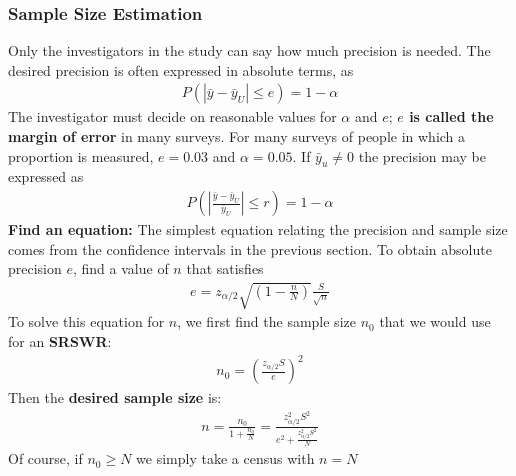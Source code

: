 \documentclass[a4paper,twoside,11pt]{article}
\begin{document}
\subsubsection{Sample Size Estimation}
Only the investigators in the study can say how much precision is needed. The desired precision is often expressed in absolute terms, as
\begin{equation*}
\begin{aligned}
P(|\bar{y} - \bar{y}_U| \le e) = 1-\alpha
\end{aligned}
\end{equation*}
The investigator must decide on reasonable values for $\alpha$ and $e$; \textbf{$e$ is called the margin of error} in many surveys. For many surveys of people in which a proportion is measured, $e=0.03$ and $\alpha=0.05$.
\newline
If $\bar{y}_u \ne 0$ the precision may be expressed as 
\begin{equation*}
\begin{aligned}
P(|\frac{\bar{y}-\bar{y}_U}{\bar{y}_U}| \le r ) = 1- \alpha
\end{aligned}
\end{equation*}
\newline
\newline
\textbf{Find an equation:} The simplest equation relating the precision and sample size comes from the confidence intervals in the previous section. To obtain absolute precision $e$, find a value of $n$ that satisfies
\begin{equation*}
\begin{aligned}
e = z_{\alpha/2}\sqrt{(1-\frac{n}{N})} \frac{S}{\sqrt{n}}
\end{aligned}
\end{equation*}
To solve this equation for $n$, we first find the sample size $n_0$ that we would use for an \textbf{SRSWR}:
\begin{equation*}
\begin{aligned}
n_0 = (\frac{z_{\alpha/2}S}{e})^2
\end{aligned}
\end{equation*}
Then the \textbf{desired sample size} is:
\begin{equation*}
\begin{aligned}
n = \frac{n_0}{1+ \frac{n_0}{N}} = \frac{z_{\alpha/2}^2 S^2}{e^2 + \frac{z_{\alpha/2}^2 S^2}{N}}
\end{aligned}
\end{equation*}
Of course, if $n_0 \ge N$ we simply take a census with $n=N$
\end{document}
